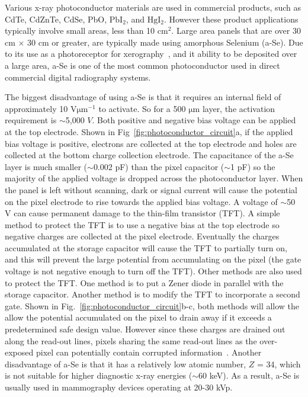 Various x-ray photoconductor materials are used in commercial products, such as CdTe, CdZnTe, CdSe, PbO, $\mathrm{PbI_2}$, and $\mathrm{HgI_2}$.  However these product applications typically involve small areas, less than 10 $\mathrm{cm^2}$.  Large area panels that are over 30 cm $\times$ 30 cm or greater, are typically made using amorphous Selenium (a-Se).  Due to its use as a photoreceptor for xerography~\citep{Mort1989}, and it ability to be deposited over a large area, a-Se is one of the most common photoconductor used in direct commercial digital radiography systems.

The biggest disadvantage of using a-Se is that it requires an internal field of approximately 10 $\mathrm{V \mu m^{-1}}$ to activate.  So for a 500 $\mathrm{\mu m}$ layer, the activation requirement is $\sim$5,000 $V$.  Both positive and negative bias voltage can be applied at the top electrode.  Shown in Fig~\ref{fig:photoconductor_circuit}a, if the applied bias voltage is positive, electrons are collected at the top electrode and holes are collected at the bottom charge collection electrode.  The capacitance of the a-Se layer is much smaller ($\sim$0.002 pF) than the pixel capacitor ($\sim$1 pF) so the majority of the applied voltage is dropped across the photoconductor layer.  When the panel is left without scanning, dark or signal current will cause the potential on the pixel electrode to rise towards the applied bias voltage.  A voltage of $\sim$50 V can cause permanent damage to the thin-film transistor (TFT).  A simple method to protect the TFT is to use a negative bias at the top electrode so negative charges are collected at the pixel electrode.  Eventually the charges accumulated at the storage capacitor will cause the TFT to partially turn on, and this will prevent the large potential from accumulating on the pixel (the gate voltage is not negative enough to turn off the TFT).  Other methods are also used to protect the TFT.  One method is to put a Zener diode in parallel with the storage capacitor.  Another method is to modify the TFT to incorporate a second gate.  Shown in Fig.~\ref{fig:photoconductor_circuit}b-c, both methods will allow the allow the potential accumulated on the pixel to drain away if it exceeds a predetermined safe design value.  However since these charges are drained out along the read-out lines, pixels sharing the same read-out lines as the over-exposed pixel can potentially contain corrupted information~\citep{Kasap2002, Rowlands2000}.  Another disadvantage of a-Se is that it has a relatively low atomic number, $Z$ = 34, which is not suitable for higher diagnostic x-ray energies ($\sim$60 keV).  As a result, a-Se is usually used in mammography devices operating at 20-30 kVp.
%

